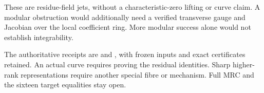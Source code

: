 \documentclass[11pt]{article}
\begin{document}
These are residue-field jets, without a characteristic-zero lifting
or curve claim. A modular obstruction would additionally need a
verified transverse gauge and Jacobian over the local coefficient
ring. More modular success alone would not establish integrability.

The authoritative receipts are
 and
, with frozen inputs and exact
certificates retained. An actual curve requires proving the residual
identities. Sharp higher-rank representations require another special
fibre or mechanism. Full MRC and the sixteen target equalities stay open.
\end{document}
